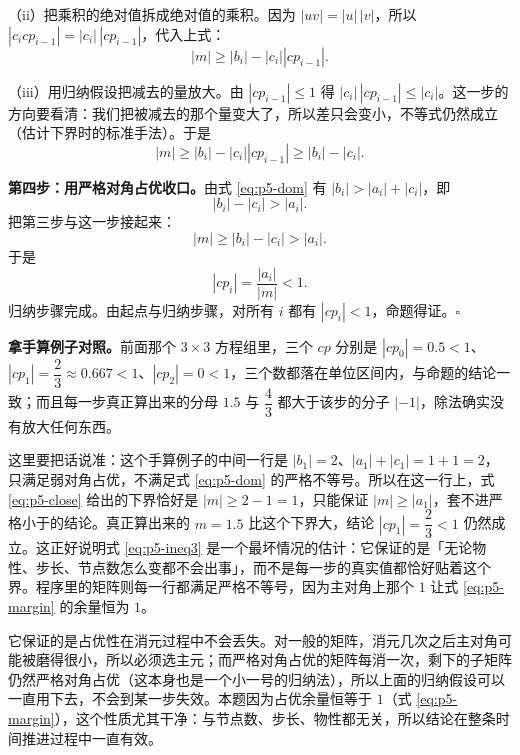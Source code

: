 （ii）把乘积的绝对值拆成绝对值的乘积。因为 $|uv|=|u|\,|v|$，所以 $|c_icp_{i-1}|=|c_i|\,|cp_{i-1}|$，代入上式：
\begin{equation}
\left|m\right|\ge\left|b_i\right|-\left|c_i\right|\left|cp_{i-1}\right| .
\label{eq:p5-ineq2}
\end{equation}

（iii）用归纳假设把减去的量放大。由 $|cp_{i-1}|\le1$ 得 $|c_i|\,|cp_{i-1}|\le|c_i|$。这一步的方向要看清：我们把被减去的那个量变大了，所以差只会变小，不等式仍然成立（估计下界时的标准手法）。于是
\begin{equation}
\left|m\right|\ge\left|b_i\right|-\left|c_i\right|\left|cp_{i-1}\right|\ge\left|b_i\right|-\left|c_i\right| .
\label{eq:p5-ineq3}
\end{equation}

\textbf{第四步：用严格对角占优收口。}由式 \eqref{eq:p5-dom} 有 $|b_i|>|a_i|+|c_i|$，即
\begin{equation}
\left|b_i\right|-\left|c_i\right|>\left|a_i\right| .
\label{eq:p5-close}
\end{equation}
把第三步与这一步接起来：
\begin{equation}
\left|m\right|\ge\left|b_i\right|-\left|c_i\right|>\left|a_i\right| .
\label{eq:p5-chain}
\end{equation}
于是
\begin{equation}
\left|cp_i\right|=\frac{\left|a_i\right|}{\left|m\right|}<1 .
\label{eq:p5-cplt1}
\end{equation}
归纳步骤完成。由起点与归纳步骤，对所有 $i$ 都有 $|cp_i|<1$，命题得证。$\square$

\textbf{拿手算例子对照。}前面那个 $3\times3$ 方程组里，三个 $cp$ 分别是 $|cp_0|=0.5<1$、$|cp_1|=\dfrac23\approx0.667<1$、$|cp_2|=0<1$，三个数都落在单位区间内，与命题的结论一致；而且每一步真正算出来的分母 $1.5$ 与 $\dfrac43$ 都大于该步的分子 $|-1|$，除法确实没有放大任何东西。

这里要把话说准：这个手算例子的中间一行是 $|b_1|=2$、$|a_1|+|c_1|=1+1=2$，只满足弱对角占优，不满足式 \eqref{eq:p5-dom} 的严格不等号。所以在这一行上，式 \eqref{eq:p5-close} 给出的下界恰好是 $|m|\ge2-1=1$，只能保证 $|m|\ge|a_1|$，套不进严格小于的结论。真正算出来的 $m=1.5$ 比这个下界大，结论 $|cp_1|=\dfrac23<1$ 仍然成立。这正好说明式 \eqref{eq:p5-ineq3} 是一个最坏情况的估计：它保证的是「无论物性、步长、节点数怎么变都不会出事」，而不是每一步的真实值都恰好贴着这个界。程序里的矩阵则每一行都满足严格不等号，因为主对角上那个 $1$ 让式 \eqref{eq:p5-margin} 的余量恒为 $1$。

它保证的是占优性在消元过程中不会丢失。对一般的矩阵，消元几次之后主对角可能被磨得很小，所以必须选主元；而严格对角占优的矩阵每消一次，剩下的子矩阵仍然严格对角占优（这本身也是一个小一号的归纳法），所以上面的归纳假设可以一直用下去，不会到某一步失效。本题因为占优余量恒等于 $1$（式 \eqref{eq:p5-margin}），这个性质尤其干净：与节点数、步长、物性都无关，所以结论在整条时间推进过程中一直有效。

